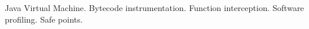\documentclass[bsc, en, classic, scr, a4paper]{ufbathesis}
\begin{document}

\abstract

\begin{keywords}
  Java Virtual Machine.
  Bytecode instrumentation.
  Function interception.
  Software profiling.
  Safe points.
\end{keywords}


\tableofcontents

\listoffigures


%
\lstlistoflistings


\iffalse
\chapter*{Lista de Siglas}

\begin{acronym}[PGCOMP]
    \acro{PGCOMP}{Programa de Pós-Graduação em Ciência da Computação}
    \acro{CNPq}{Conselho Nacional de Desenvolvimento Centífico e Tecnológico}
\end{acronym}
\fi

\mainmatter

%


\backmatter




\begin{appendices}
\renewcommand{\chaptername}{Appendix} %

\end{appendices}

% 
% 
% 

\end{document}
